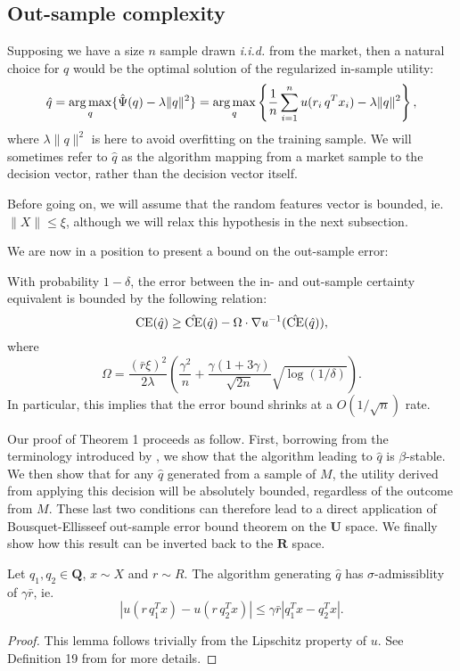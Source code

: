 \subsection{Out-sample complexity}

Supposing we have a size $n$ sample drawn \textit{i.i.d.} from the market, then a natural
choice for $q$ would be the optimal solution of the regularized in-sample utility:
\[
  \hat q = \operatorname*{arg\,max}_q\{\hat\Psi(q)-\lambda\|q\|^2\}  = \operatorname*{arg\,max}_q \left\{\frac{1}{n}\sum_{i=1}^n u(r_i\,q^Tx_i) - \lambda\|q\|^2\right\},
\]
where $\lambda\|q\|^2$ is here to avoid overfitting on the training sample. We will
sometimes refer to $\hat q$ as the algorithm mapping from a market sample to the decision
vector, rather than the decision vector itself.

Before going on, we will assume that the random features vector is bounded,
ie. $\|X\|\leq\xi$, although we will relax this hypothesis in the next subsection.

We are now in a position to present a bound on the out-sample error:
\begin{thm}
  \label{thm_oos}
  With probability $1-\delta$, the error between the in- and out-sample certainty
  equivalent is bounded by the following relation:
  \[
    \operatorname{CE}(\hat q) \geq \hat{\operatorname{CE}}(\hat q) - \Omega\cdot\nabla u^{-1}(\hat{\operatorname{CE}}(\hat q)),
  \]
  where
  \[
    \Omega = \frac{(\bar r\xi)^2}{2\lambda} \left(\frac{\gamma^2}{n} + \frac{\gamma(1+3\gamma)}{\sqrt{2n}}\sqrt{\log(1/\delta)}\right).
  \]
In particular, this implies that the error bound shrinks at a $O(1/\sqrt{n})$ rate. 
\end{thm}

Our proof of Theorem 1 proceeds as follow. First, borrowing from the terminology
introduced by \cite{bousquet2002stability}, we show that the algorithm leading to $\hat q$
is $\beta$-stable. We then show that for any $\hat q$ generated from a sample of $M$, the
utility derived from applying this decision will be absolutely bounded, regardless of the
outcome from $M$. These last two conditions can therefore lead to a direct application of
Bousquet-Ellisseef out-sample error bound theorem on the $\bm U$ space. We finally show how
this result can be inverted back to the $\bm R$ space.

\begin{lemma}
  \label{sigma-adm}
  Let $q_1,q_2\in\bm Q$, $x\sim X$ and $r\sim R$. The algorithm generating $\hat q$ has
  $\sigma$-admissiblity of $\gamma\bar r$, ie.
  \[
    |u(r\,q_1^T x) - u(r\,q_2^T x)| \leq \gamma\bar r|q_1^Tx - q_2^Tx|.
  \]
\end{lemma}
\begin{proof}
  This lemma follows trivially from the Lipschitz property of $u$. See Definition 19 from
  \cite{bousquet2002stability} for more details.
\end{proof}

